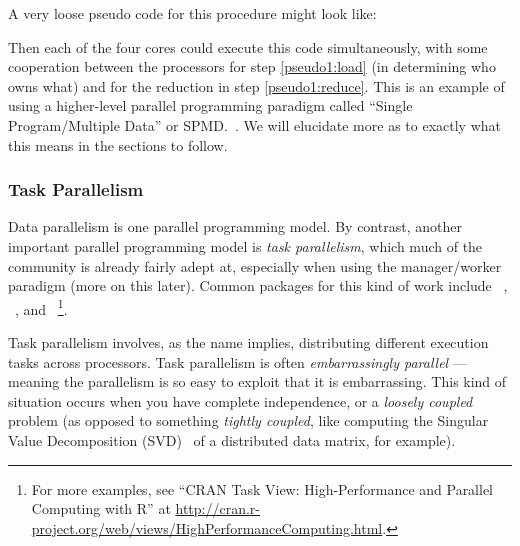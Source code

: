 A very loose pseudo code for this procedure might look like:


Then each of the four cores could execute this code simultaneously, with some
cooperation between the processors for step \ref{pseudo1:load} (in determining
who owns what) and for the reduction in step \ref{pseudo1:reduce}. This is
an example of using a higher-level parallel programming paradigm called
``Single Program/Multiple Data''
or SPMD.~.  We will elucidate more as to exactly what 
this means in the sections to follow.



\subsubsection{Task Parallelism}

Data parallelism is one parallel programming model. By contrast, another
important parallel programming model is \emph{task 
parallelism}, which much of the 
 community is already fairly adept at, especially when using the 
manager/worker paradigm (more on this 
later).  Common packages for this kind of work include 
~\citep{Tierney2012}, 
~\citep{parallel}, and 
~\citep{Rmpi}\footnote{For more examples, 
see ``CRAN Task View: High-Performance and Parallel Computing with R'' at 
\url{http://cran.r-project.org/web/views/HighPerformanceComputing.html}.}.

Task parallelism involves, as the name implies, distributing different execution
tasks across processors. Task parallelism is often \emph{embarrassingly 
parallel} --- meaning the 
parallelism is so easy to exploit that it is embarrassing. This kind of 
situation occurs when you have complete independence, or a \emph{loosely 
coupled} problem (as opposed to something 
\emph{tightly coupled}, like computing the 
Singular Value Decomposition (SVD)~ of a distributed data matrix, for 
example).  

